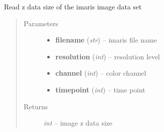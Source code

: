 \documentclass[letterpaper,10pt,english]{sphinxmanual}
\begin{document}

\begin{fulllineitems}
\label{api/ClearMap.IO:ClearMap.IO.Imaris.dataZSize}
Read z data size of the imaris image data set
\begin{quote}\begin{description}
\item[{Parameters}] \leavevmode\begin{itemize}
\item {} 
\textbf{filename} (\emph{str}) --
imaris file name

\item {} 
\textbf{resolution} (\emph{int}) --
resolution level

\item {} 
\textbf{channel} (\emph{int}) --
color channel

\item {} 
\textbf{timepoint} (\emph{int}) --
time point

\end{itemize}

\item[{Returns}] \leavevmode
\emph{int} --
image z data size

\end{description}\end{quote}

\end{fulllineitems}

\end{document}

